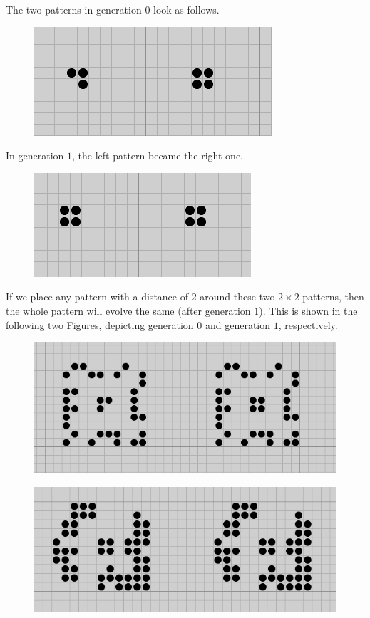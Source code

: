 The two patterns in generation $0$ look as follows.

\begin{figure}[H]
\includegraphics[scale = 0.5]{images/2022-10-31_gol_01.png}
\end{figure}

In generation $1$, the left pattern became the right one.

\begin{figure}[H]
\includegraphics[scale = 0.5]{images/2022-10-31_gol_02.png}
\end{figure}

If we place any pattern with a distance of $2$ around these two $2 \times 2 $ patterns, then the whole pattern will evolve the same (after generation $1$). This is shown in the following two Figures, depicting generation $0$ and generation $1$, respectively.


\begin{figure}[H]
\includegraphics[scale = 0.5]{images/2022-10-31_gol_03.png}
\end{figure}

\begin{figure}[H]
\includegraphics[scale = 0.5]{images/2022-10-31_gol_04.png}
\end{figure}


